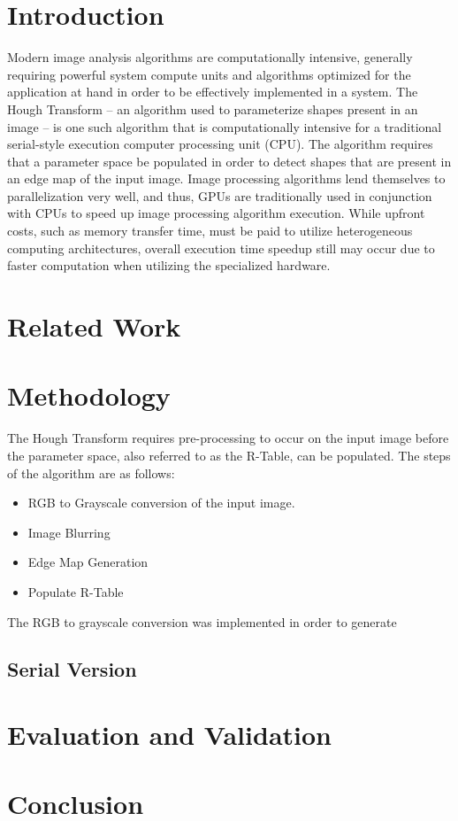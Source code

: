 \documentclass[conference]{IEEEtran}
\begin{document}
\section*{Introduction}
Modern image analysis algorithms are computationally intensive, generally requiring powerful system compute units and algorithms optimized for the application at hand in order to be effectively implemented in a system. The Hough Transform \cite{BALLARD1981111} – an algorithm used to parameterize shapes present in an image – is one such algorithm that is computationally intensive for a traditional serial-style execution computer processing unit (CPU). The algorithm requires that a parameter space be populated in order to detect shapes that are present in an edge map of the input image. Image processing algorithms lend themselves to parallelization very well, and thus, GPUs are traditionally used in conjunction with CPUs to speed up image processing algorithm execution. While upfront costs, such as memory transfer time, must be paid to utilize heterogeneous computing architectures, overall execution time speedup still may occur due to faster computation when utilizing the specialized hardware.



\section{Related Work}


\section{Methodology}
The Hough Transform requires pre-processing to occur on the input image before the parameter space, also referred to as the R-Table, can be populated. The steps of the algorithm are as follows: 

\begin{itemize}
  \item RGB to Grayscale conversion of the input image.
  \item Image Blurring 
  \item Edge Map Generation
  \item Populate R-Table
\end{itemize}

The RGB to grayscale conversion was implemented in order to generate 

\subsection{Serial Version}




\section{Evaluation and Validation}

\section{Conclusion}




% 

\end{document}
